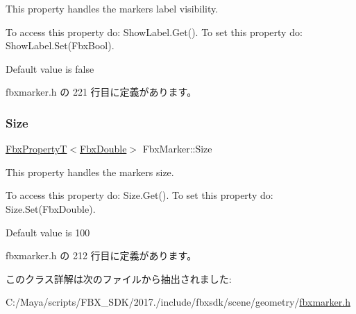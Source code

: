 This property handles the marker\textquotesingle{}s label visibility.

To access this property do\+: Show\+Label.\+Get(). To set this property do\+: Show\+Label.\+Set(\+Fbx\+Bool).

Default value is false 

 fbxmarker.\+h の 221 行目に定義があります。

\mbox{\label{class_fbx_marker_af2ee6f3a36ab8b34bde07450aca06f04}} 
\subsubsection{\texorpdfstring{Size}{Size}}
{\footnotesize\ttfamily \hyperlink{class_fbx_property_t}{Fbx\+PropertyT}$<$\hyperlink{fbxtypes_8h_a171e72a1c46fc15c1a6c9c31948c1c5b}{Fbx\+Double}$>$ Fbx\+Marker\+::\+Size}

This property handles the marker\textquotesingle{}s size.

To access this property do\+: Size.\+Get(). To set this property do\+: Size.\+Set(\+Fbx\+Double).

Default value is 100 

 fbxmarker.\+h の 212 行目に定義があります。



このクラス詳解は次のファイルから抽出されました\+:\begin{DoxyCompactItemize}
\item 
C\+:/\+Maya/scripts/\+F\+B\+X\+\_\+\+S\+D\+K/2017./include/fbxsdk/scene/geometry/\hyperlink{fbxmarker_8h}{fbxmarker.\+h}\end{DoxyCompactItemize}
